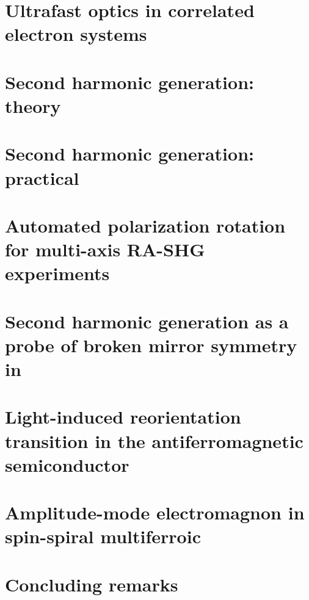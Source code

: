 \documentclass[
    letterpaper,
    12pt,
    openbib,
]{memoir}
\begin{document}
\frontmatter*


\acknowledgements

\clearpage
\preface

\clearpage

\tableofcontents
\clearpage
\listoffigures
\clearpage
\listoftables
\clearpage

\mainmatter*
\chapter{Ultrafast optics in correlated electron systems\label{ch:intro}}

\chapter{Second harmonic generation: theory\label{ch:shgtheory}}

\chapter{Second harmonic generation: practical}\label{ch:shgpractice}

\chapter{Automated polarization rotation for multi-axis RA-SHG experiments}\label{ch:polrotators}

\chapter{Second harmonic generation as a probe of broken mirror symmetry in \tastwo}\label{ch:tastwo}

\chapter{Light-induced reorientation transition in the antiferromagnetic semiconductor }\label{ch:cmb}

\chapter{Amplitude-mode electromagnon in spin-spiral multiferroic}\label{ch:cubr2}

\chapter{Concluding remarks}\label{ch:conclusion}

\backmatter*

\end{document}
